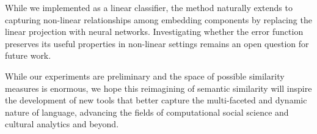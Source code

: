 
While we implemented \wc as a linear classifier, the method naturally extends to capturing non-linear relationships among embedding components by replacing the linear projection with neural networks. Investigating whether the error function preserves its useful properties in non-linear settings remains an open question for future work.

While our experiments are preliminary and the space of possible similarity measures is enormous, we hope this reimagining of semantic similarity will inspire the development of new tools that better capture the multi-faceted and dynamic nature of language, advancing the fields of computational social science and cultural analytics and beyond.



